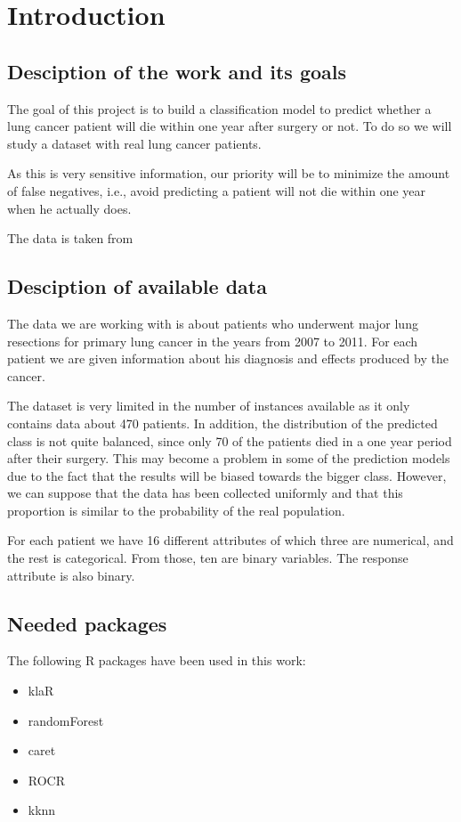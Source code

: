 \section{Introduction}

\subsection{Desciption of the work and its goals}

The goal of this project is to build a classification model to predict whether
a lung cancer patient will die within one year after surgery or not. To do so
we will study a dataset with real lung cancer patients.

As this is very sensitive information, our priority will be to minimize the
amount of false negatives, i.e., avoid predicting a patient will not die within
one year when he actually does.

The data is taken from
\cite{zieba2013boosted}

\subsection{Desciption of available data}

The data we are working with is about patients who underwent major lung
resections for primary lung cancer in the years from 2007 to 2011. For each
patient we are given information about his diagnosis and effects produced
by the cancer.

The dataset is very limited in the number of instances available as it only contains
data about 470 patients. In addition, the distribution of the predicted class is not quite
balanced,
since only 70 of the patients died in a one year period after their surgery. This may
become a problem in some of the prediction models due to the fact that the results
will be biased towards the bigger class. However, we can suppose that the data has been
collected uniformly and that this proportion is similar to the probability of the real population.

For each patient we have 16 different attributes of which three are numerical, and
the rest is categorical. From those, ten are binary variables. The response attribute is
also binary.


\subsection{Needed packages}

The following R packages have been used in this work:

\begin{itemize}
\item{klaR}
\item{randomForest}
\item{caret}
\item{ROCR}
\item{kknn}
\end{itemize}
